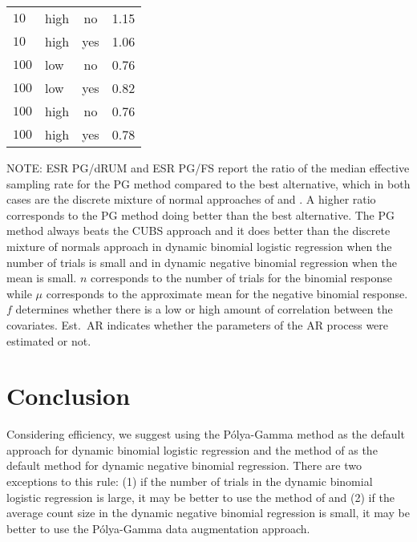 \documentclass[12pt]{article}
\newcommand{\Polya}{P\'{o}lya}
\begin{document}
\begin{table}
\begin{center}
\begin{tabular}{l l c c}
$10$ & high & no & 1.15 \\
$10$ & high & yes & 1.06 \\

$100$ & low & no & 0.76 \\
$100$ & low & yes & 0.82 \\

$100$ & high & no & 0.76 \\
$100$ & high & yes & 0.78 \\

\end{tabular}
\end{center}

NOTE: ESR PG/dRUM and ESR PG/FS report the ratio of the median effective
sampling rate for the PG method compared to the best alternative, which in both
cases are the discrete mixture of normal approaches of \cite{fussl-etal-2013}
and \cite{fruhwirth-schnatter-etal-2009}.  A higher ratio corresponds to the PG
method doing better than the best alternative.  The PG method always beats the
CUBS approach and it does better than the discrete mixture of normals approach
in dynamic binomial logistic regression when the number of trials is small and
in dynamic negative binomial regression when the mean is small.  $n$ corresponds
to the number of trials for the binomial response while $\mu$ corresponds to the
approximate mean for the negative binomial response.  $f$ determines whether
there is a low or high amount of correlation between the covariates.  Est.\ AR
indicates whether the parameters of the AR process were estimated or not.

\end{table}

\section{Conclusion}

Considering efficiency, we suggest using the \Polya-Gamma method as the default
approach for dynamic binomial logistic regression and the method of
\cite{fruhwirth-schnatter-etal-2009} as the default method for dynamic negative
binomial regression.  There are two exceptions to this rule: (1) if the number
of trials in the dynamic binomial logistic regression is large, it may be better
to use the method of \cite{fussl-etal-2013} and (2) if the average count size in
the dynamic negative binomial regression is small, it may be better to use the
\Polya-Gamma data augmentation approach.
\end{document}

